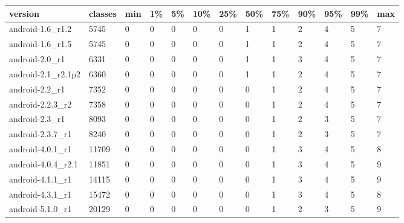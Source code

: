 \begin{tabular}{|l|l|l|l|l|l|l|l|l|l|l|l|l|}
\hline
version&classes&min&1\%&5\%&10\%&25\%&50\%&75\%&90\%&95\%&99\%&max\\
\hline
android-1.6\_r1.2&5745&0&0&0&0&0&1&1&2&4&5&7\\
\hline
android-1.6\_r1.5&5745&0&0&0&0&0&1&1&2&4&5&7\\
\hline
android-2.0\_r1&6331&0&0&0&0&0&1&1&3&4&5&7\\
\hline
android-2.1\_r2.1p2&6360&0&0&0&0&0&1&1&2&4&5&7\\
\hline
android-2.2\_r1&7352&0&0&0&0&0&0&1&2&4&5&7\\
\hline
android-2.2.3\_r2&7358&0&0&0&0&0&0&1&2&4&5&7\\
\hline
android-2.3\_r1&8093&0&0&0&0&0&0&1&2&3&5&7\\
\hline
android-2.3.7\_r1&8240&0&0&0&0&0&0&1&2&3&5&7\\
\hline
android-4.0.1\_r1&11709&0&0&0&0&0&0&1&3&4&5&8\\
\hline
android-4.0.4\_r2.1&11851&0&0&0&0&0&0&1&3&4&5&9\\
\hline
android-4.1.1\_r1&14115&0&0&0&0&0&0&1&3&4&5&9\\
\hline
android-4.3.1\_r1&15472&0&0&0&0&0&0&1&3&4&5&8\\
\hline
android-5.1.0\_r1&20129&0&0&0&0&0&0&1&2&3&5&9\\
\hline
\end{tabular}
